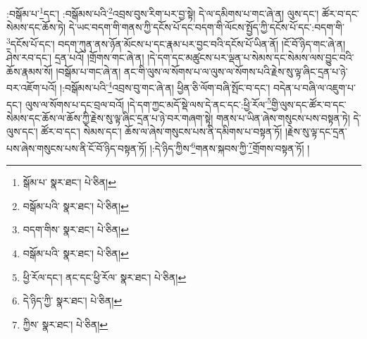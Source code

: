 :བསྒོམ་པ་\footnote{སྒོམ་པ་  སྣར་ཐང་།  པེ་ཅིན། }དང་། :བསྒོམས་པའི་\footnote{བསྒོམ་པའི་  སྣར་ཐང་།  པེ་ཅིན། }འབྲས་བུས་རིག་པར་བྱ་སྟེ། དེ་ལ་དམིགས་པ་གང་ཞེ་ན། ལུས་དང་། ཚོར་བ་དང་སེམས་དང་ཆོས་ཏེ། དེ་ཡང་བདག་གི་གནས་ཀྱི་དངོས་པོ་དང་བདག་གི་ལོངས་སྤྱོད་ཀྱི་དངོས་པོ་དང་:བདག་གི་\footnote{བདག་གིས་  སྣར་ཐང་།  པེ་ཅིན། }དངོས་པོ་དང་། བདག་ཀུན་ནས་ཉོན་མོངས་པ་དང་རྣམ་པར་བྱང་བའི་དངོས་པོ་ཡིན་ནོ། །ངོ་བོ་ཉིད་གང་ཞེ་ན། ཤེས་རབ་དང་། དྲན་པའོ། །གྲོགས་གང་ཞེ་ན། །དེ་དག་དང་མཚུངས་པར་ལྡན་པ་སེམས་དང་སེམས་ལས་བྱུང་བའི་ཆོས་རྣམས་སོ། །བསྒོམ་པ་གང་ཞེ་ན། ནང་གི་ལུས་ལ་སོགས་པ་ལ་ལུས་ལ་སོགས་པའི་རྗེས་སུ་ལྟ་ཞིང་དྲན་པ་ཉེ་བར་འཇོག་པའོ། །:བསྒོམས་པའི་\footnote{བསྒོམ་པའི་  སྣར་ཐང་།  པེ་ཅིན། }འབྲས་བུ་གང་ཞེ་ན། ཕྱིན་ཅི་ལོག་བཞི་སྤོང་བ་དང་། བདེན་པ་བཞི་ལ་འཇུག་པ་དང་། ལུས་ལ་སོགས་པ་དང་བྲལ་བའོ། །དེ་དག་ཀྱང་མདོ་སྡེ་ལས་དེ་ནང་དང་:ཕྱི་རོལ་\footnote{ཕྱི་རོལ་དང་། ནང་དང་ཕྱི་རོལ་  སྣར་ཐང་།  པེ་ཅིན། }གྱི་ལུས་དང་ཚོར་བ་དང་སེམས་དང་ཆོས་ལ་ཆོས་ཀྱི་རྗེས་སུ་ལྟ་ཞིང་དྲན་པ་ཉེ་བར་གཞག་སྟེ། གནས་པ་ཡིན་ཞེས་གསུངས་པས་བསྟན་ཏེ། དེ་ལུས་དང་། ཚོར་བ་དང་། སེམས་དང་། ཆོས་ལ་ཞེས་གསུངས་པས་ནི་དམིགས་པ་བསྟན་ཏོ། །རྗེས་སུ་ལྟ་དང་དྲན་པས་ཞེས་གསུངས་པས་ནི་ངོ་བོ་ཉིད་བསྟན་ཏོ། །:དེ་ཉིད་ཀྱིས་\footnote{དེ་ཉིད་ཀྱི་  སྣར་ཐང་།  པེ་ཅིན། }གནས་སྐབས་ཀྱི་\footnote{ཀྱིས་  སྣར་ཐང་།  པེ་ཅིན། }གྲོགས་བསྟན་ཏོ། །
